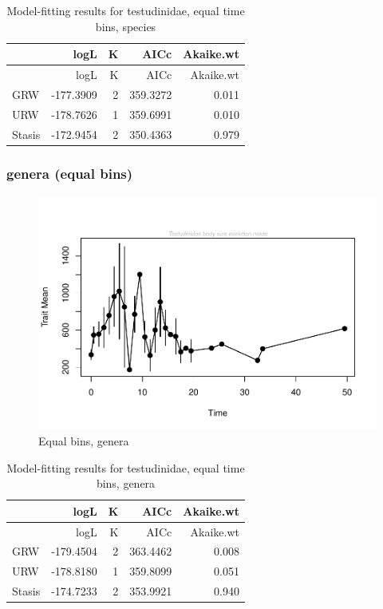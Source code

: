 \documentclass[]{article}
\begin{document}
\begin{longtable}[]{@{}lrrrr@{}}
\caption{Model-fitting results for testudinidae, equal time bins,
species}\tabularnewline
\toprule
& logL & K & AICc & Akaike.wt\tabularnewline
\midrule
\endfirsthead
\toprule
& logL & K & AICc & Akaike.wt\tabularnewline
\midrule
\endhead
GRW & -177.3909 & 2 & 359.3272 & 0.011\tabularnewline
URW & -178.7626 & 1 & 359.6991 & 0.010\tabularnewline
Stasis & -172.9454 & 2 & 350.4363 & 0.979\tabularnewline
\bottomrule
\end{longtable}

\newpage

\subsubsection{genera (equal bins)}\label{genera-equal-bins}

\begin{figure}[htbp]
\centering
\includegraphics{MA_JJ_files/figure-latex/Play around with time bins, generic level-1.pdf}
\caption{Equal bins, genera}
\end{figure}

\begin{longtable}[]{@{}lrrrr@{}}
\caption{Model-fitting results for testudinidae, equal time bins,
genera}\tabularnewline
\toprule
& logL & K & AICc & Akaike.wt\tabularnewline
\midrule
\endfirsthead
\toprule
& logL & K & AICc & Akaike.wt\tabularnewline
\midrule
\endhead
GRW & -179.4504 & 2 & 363.4462 & 0.008\tabularnewline
URW & -178.8180 & 1 & 359.8099 & 0.051\tabularnewline
Stasis & -174.7233 & 2 & 353.9921 & 0.940\tabularnewline
\bottomrule
\end{longtable}
\end{document}
